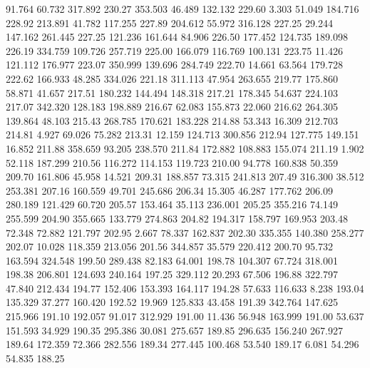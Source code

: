   91.764   60.732  317.892       230.27
 353.503   46.489  132.132       229.60
   3.303   51.049  184.716       228.92
 213.891   41.782  117.255       227.89
 204.612   55.972  316.128       227.25
  29.244  147.162  261.445       227.25
 121.236  161.644   84.906       226.50
 177.452  124.735  189.098       226.19
 334.759  109.726  257.719       225.00
 166.079  116.769  100.131       223.75
  11.426  121.112  176.977       223.07
 350.999  139.696  284.749       222.70
  14.661   63.564  179.728       222.62
 166.933   48.285  334.026       221.18
 311.113   47.954  263.655       219.77
 175.860   58.871   41.657       217.51
 180.232  144.494  148.318       217.21
 178.345   54.637  224.103       217.07
 342.320  128.183  198.889       216.67
  62.083  155.873   22.060       216.62
 264.305  139.864   48.103       215.43
 268.785  170.621  183.228       214.88
  53.343   16.309  212.703       214.81
   4.927   69.026   75.282       213.31
  12.159  124.713  300.856       212.94
 127.775  149.151   16.852       211.88
 358.659   93.205  238.570       211.84
 172.882  108.883  155.074       211.19
   1.902   52.118  187.299       210.56
 116.272  114.153  119.723       210.00
  94.778  160.838   50.359       209.70
 161.806   45.958   14.521       209.31
 188.857   73.315  241.813       207.49
 316.300   38.512  253.381       207.16
 160.559   49.701  245.686       206.34
  15.305   46.287  177.762       206.09
 280.189  121.429   60.720       205.57
 153.464   35.113  236.001       205.25
 355.216   74.149  255.599       204.90
 355.665  133.779  274.863       204.82
 194.317  158.797  169.953       203.48
  72.348   72.882  121.797       202.95
   2.667   78.337  162.837       202.30
 335.355  140.380  258.277       202.07
  10.028  118.359  213.056       201.56
 344.857   35.579  220.412       200.70
  95.732  163.594  324.548       199.50
 289.438   82.183   64.001       198.78
 104.307   67.724  318.001       198.38
 206.801  124.693  240.164       197.25
 329.112   20.293   67.506       196.88
 322.797   47.840  212.434       194.77
 152.406  153.393  164.117       194.28
  57.633  116.633    8.238       193.04
 135.329   37.277  160.420       192.52
  19.969  125.833   43.458       191.39
 342.764  147.625  215.966       191.10
 192.057   91.017  312.929       191.00
  11.436   56.948  163.999       191.00
  53.637  151.593   34.929       190.35
 295.386   30.081  275.657       189.85
 296.635  156.240  267.927       189.64
 172.359   72.366  282.556       189.34
 277.445  100.468   53.540       189.17
   6.081   54.296   54.835       188.25

